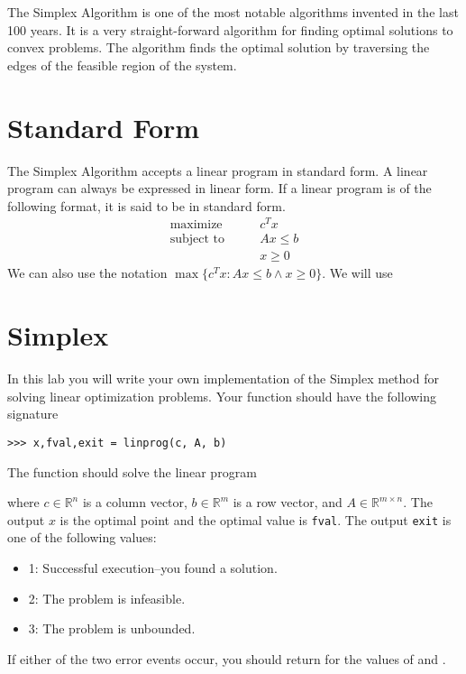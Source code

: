 \label{lab:Simplex}

The Simplex Algorithm is one of the most notable algorithms invented in the last 100 years.
It is a very straight-forward algorithm for finding optimal solutions to convex problems.
The algorithm finds the optimal solution by traversing the edges of the feasible region of the system.

\section{Standard Form}
The Simplex Algorithm accepts a linear program in standard form.
A linear program can always be expressed in linear form.
If a linear program is of the following format, it is said to be in standard form.
\begin{align*}
\mbox{maximize}\qquad & c^T x \\
\mbox{subject to}\qquad & A x \leq b \\
 & x \geq 0
\end{align*}
We can also use the notation $\max\{c^Tx: Ax \leq b \land x \geq 0\}$.  We will use




\section*{Simplex}
In this lab you will write your own implementation of the Simplex method for solving linear optimization problems.
Your function should have the following signature
\begin{lstlisting}
>>> x,fval,exit = linprog(c, A, b)
\end{lstlisting}
The function should solve the linear program


where $c \in \mathbb{R}^n$ is a column vector, $b \in \mathbb{R}^m$ is a row vector, and $A \in \mathbb{R}^{m \times n}$.
The output $x$ is the optimal point and the optimal value is {\tt fval}.
The output {\tt exit} is one of the following values:
\begin{itemize}
\item 1: Successful execution--you found a solution.
\item 2: The problem is infeasible.
\item 3: The problem is unbounded.
\end{itemize}
If either of the two error events occur, you should return  for the values of  and .

